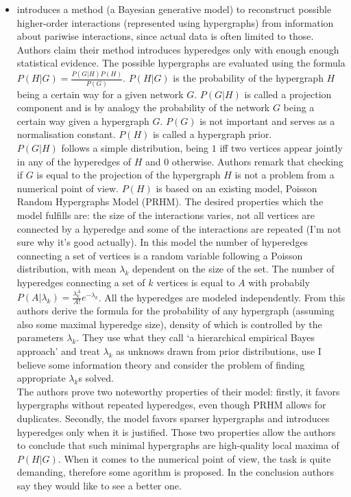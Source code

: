 \documentclass[a4paper,12pt]{article}
\theoremstyle{definition}
\theoremstyle{remark}
\begin{document}
\begin{itemize}
    \item 
    \cite{Young2021}
    introduces a method (a Bayesian generative model) to reconstruct possible higher-order interactions (represented using hypergraphs) from information about pariwise interactions, since actual data is often limited to those. Authors claim their method introduces hyperedges only with enough enough statistical evidence. The possible hypergraphs are evaluated using the formula \(P(H|G) = \frac{P(G|H)P(H)}{P(G)}\). \(P(H|G)\) is the probability of the hypergraph $H$ being a certain way for a given network $G$. $P(G|H)$ is called a projection component and is by analogy the probability of the network $G$ being a certain way given a hypergraph $G$. $P(G)$ is not important and serves as a normalisation constant. $P(H)$ is called a hypergraph prior. \\ 
    $P(G|H)$ follows a simple distribution, being $1$ iff two vertices appear jointly in any of the hyperedges of $H$ and $0$ otherwise. Authors remark that checking if $G$ is equal to the projection of the hypergraph $H$ is not a problem from a numerical point of view.
    $P(H)$ is based on an existing model, Poisson Random Hypergraphs Model (PRHM). The desired properties which the model fulfills are: the size of the interactions varies, not all vertices are connected by a hyperedge and some of the interactions are repeated (I'm not sure why it's good actually). 
    In this model the number of hyperedges connecting a set of vertices is a random variable following a Poisson distribution, with mean $\lambda_k$ dependent on the size of the set. The number of hyperedges connecting a set of $k$ vertices is equal to $A$ with probabily $P(A|\lambda_k) = \frac{\lambda_k^A}{A!}e^{-\lambda_k}$. All the hyperedges are modeled independently. 
    From this authors derive the formula for the probability of any hypergraph (assuming also some maximal hyperedge size), density of which is controlled by the parameters $\lambda_k$. They use what they call `a hierarchical empirical Bayes approach' and treat $\lambda_k$ as unknows drawn from prior distributions, use I believe some information theory and consider the problem of finding appropriate $\lambda_k$s solved. \\ 
    The authors prove two noteworthy properties of their model: firstly, it favors hypergraphs without repeated hyperedges, even though PRHM allows for duplicates. Secondly, the model favors sparser hypergraphs and introduces hyperedges only when it is justified. Those two properties allow the authors to conclude that such minimal hypergraphs are high-quality local maxima of $P(H|G)$. When it comes to the numerical point of view, the task is quite demanding, therefore some agorithm is proposed. In the conclusion authors say they would like to see a better one. \\

\end{itemize}
\end{document}
